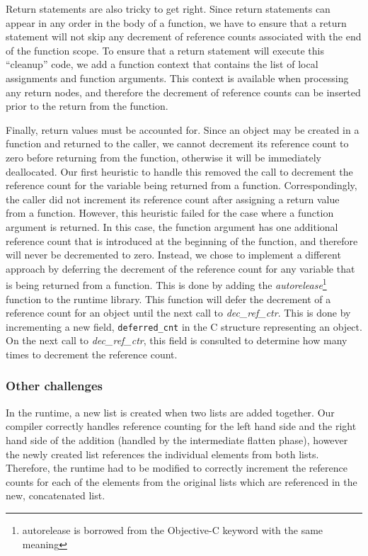 \documentclass{sigplanconf}
\newcommand{\afunction}[1]{\textit{#1}}
\newcommand{\afield}[1]{\texttt{#1}}
\begin{document}
Return statements are also tricky to get right.  Since return statements can appear in any order in the body of a function, we have to ensure that a return statement will not skip any decrement of reference counts associated with the end of the function scope.  To ensure that a return statement will execute this ``cleanup'' code, we add a function context that contains the list of local assignments and function arguments.  This context is available when processing any return nodes, and therefore the decrement of reference counts can be inserted prior to the return from the function.  

Finally, return values must be accounted for.  Since an object may be created in a function and returned to the caller, we cannot decrement its reference count to zero before returning from the function, otherwise it will be immediately deallocated.  Our first heuristic to handle this removed the call to decrement the reference count for the variable being returned from a function.  Correspondingly, the caller did not increment its reference count after assigning a return value from a function.  However, this heuristic failed for the case where a function argument is returned.  In this case, the function argument has one additional reference count that is introduced at the beginning of the function, and therefore will never be decremented to zero.  Instead, we chose to implement a different approach by deferring the decrement of the reference count for any variable that is being returned from a function.  This is done by adding the \afunction{autorelease}\footnote{autorelease is borrowed from the Objective-C keyword with the same meaning} function to the runtime library.  This function will defer the decrement of a reference count for an object until the next call to \afunction{dec\_ref\_ctr}.  This is done by incrementing a new field, \afield{deferred\_cnt} in the C structure representing an object.  On the next call to \afunction{dec\_ref\_ctr}, this field is consulted to determine how many times to decrement the reference count.

\subsubsection{Other challenges}
In the runtime, a new list is created when two lists are added together.  Our compiler correctly handles reference counting for the left hand side and the right hand side of the addition (handled by the intermediate flatten phase), however the newly created list references the individual elements from both lists.  Therefore, the runtime had to be modified to correctly increment the reference counts for each of the elements from the original lists which are referenced in the new, concatenated list.
\end{document}
